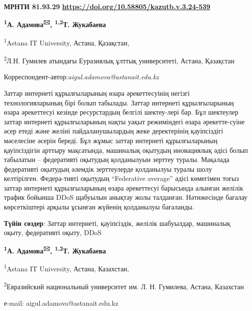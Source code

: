 \newpage
{\bfseries МРНТИ 81.93.29}
\hfill {\bfseries \href{https://doi.org/10.58805/kazutb.v.3.24-539}{https://doi.org/10.58805/kazutb.v.3.24-539}}


\begin{center}

{\bfseries \textsuperscript{1}А. Адамова\textsuperscript{🖂},
\textsuperscript{1,2}Т. Жукабаева}

\textsuperscript{1}Astana IT University, Астана, Қазақстан,

\textsuperscript{2}Л.Н. Гумилев атындағы Еуразиялық ұлттық университеті,
Астана, Қазақстан
\end{center}
Корреспондент-автор:\emph{aigul.adamova@astanait.edu.kz}\vspace{0.5cm}

Заттар интернеті құрылғыларының өзара әрекеттесуінің негізгі
технологияларының бірі болып табылады. Заттар интернеті құрылғыларының
өзара әрекеттесуі кезінде ресурстардың белгілі шектеу-лері бар. Бұл
шектеулер заттар интернеті құрылғыларының нақты уақыт режиміндегі өзара
әрекетте-суіне әсер етеді және желіні пайдаланушылардың жеке деректерінің
қауіпсіздігі мәселесіне әсерін береді. Бұл жұмыс заттар интернеті
құрылғыларының қауіпсіздігін арттыру мақсатында, машиналық оқытудың
иновациялық әдісі болып табылатын -- федеративті оқытудың қолданылуын
зерттеу туралы. Мақалада федеративті оқытудың әлемдік зерттеулерде
қолданылуы туралы шолу келтірілген. Федера-тивті оқытудың ``Federative
average'' әдісі көмегімен тоғыз заттар интернеті құрылғыларының өзара
әрекеттесуі барысында алынған желілік трафик бойынша DDoS щабуылын
анықтау жолы талданған. Нәтижесінде бағалау көрсеткіштері арқылы ұсынған
жүйенің қолданылуы бағаланды.

{\bfseries Түйін сөздер}: Заттар интернеті, қауіпсіздік, желілік шабуылдар,
машиналық оқыту, федеративті оқыту, DDoS


\begin{center}
{\bfseries \textsuperscript{1}А. Адамова\textsuperscript{🖂},
\textsuperscript{1,2}Т. Жукабаева}

\textsuperscript{1}Astana IT University, Астана, Казахстан,

\textsuperscript{2}Евразийский национальный университет им. Л. Н.
Гумилева, Астана, Казахстан

е-mail: aigul.adamova@astanait.edu.kz
\end{center}


